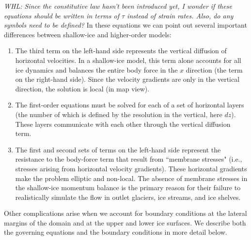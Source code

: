 \textit{WHL: Since the constitutive law hasn't been introduced yet, I wonder if these equations should be written in terms
of $\tau$ instead of strain rates. Also, do any symbols need to be defined?}
In these equations we can point out several important differences between shallow-ice and higher-order models: 
\begin{enumerate}
\item  The third term on the left-hand side represents the vertical diffusion of horizontal velocities. In a shallow-ice model, this term alone accounts for all ice dynamics and balances the entire body force in the $x$ direction (the term on the right-hand side). Since the velocity gradients are only in the vertical direction, the solution is local (in map view).

\item  The first-order equations must be solved for each of a set of horizontal layers (the number of which is defined by the resolution in the vertical, here $dz$). These layers communicate with each other through the vertical diffusion term.

\item  The first and second sets of terms on the left-hand side represent the resistance to the body-force term that result from ``membrane stresses" (i.e., stresses arising from horizontal velocity gradients). These horizontal gradients make the problem elliptic and non-local. The absence of membrane stresses in the shallow-ice momentum balance is the primary reason for their failure to realistically simulate the flow in outlet glaciers, ice streams, and ice shelves.

\end{enumerate}

Other complications arise when we account for boundary conditions at the lateral margins of the domain and at the upper and lower ice surfaces. We describe both the governing equations and the boundary conditions in more detail below.


